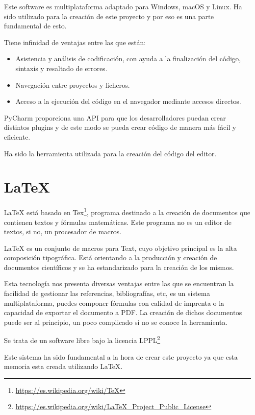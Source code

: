 \documentclass[a4paper, 12pt]{book}
\begin{document}
Este software es multiplataforma adaptado para Windows, macOS y Linux. Ha sido utilizado para la creación de este proyecto y por eso es una parte fundamental de esto.

Tiene infinidad de ventajas entre las que están:

\begin{itemize}
    \item Asistencia y análisis de codificación, con ayuda a la finalización del código, sintaxis y resaltado de errores.
    \item Navegación entre proyectos y ficheros.
    \item Acceso a la ejecución del código en el navegador mediante accesos directos.
\end{itemize}

PyCharm proporciona una API para que los desarrolladores puedan crear distintos plugins y de este modo se pueda crear código de manera más fácil y eficiente.

Ha sido la herramienta utilizada para la creación del código del editor.

\section{LaTeX} %
\label{sec:Latex}
LaTeX está basado en Tex\footnote{\url{https://es.wikipedia.org/wiki/TeX}}, programa destinado a la creación de documentos que contienen textos y fórmulas matemáticas. Este programa no es un editor de textos, si no, un procesador de macros.

LaTeX es un conjunto de macros para Text, cuyo objetivo principal es la alta composición tipográfica. Está orientando a la producción y creación de documentos científicos y se ha estandarizado para la creación de los mismos.

Esta tecnología nos presenta diversas ventajas entre las que se encuentran la facilidad de gestionar las referencias, bibliografías, etc, es un sistema multiplataforma, puedes componer fórmulas con calidad de imprenta o la capacidad de exportar el documento a PDF. La creación de dichos documentos puede ser al principio, un poco complicado si no se conoce la herramienta.

Se trata de un software libre bajo la licencia LPPL\footnote{\url{https://es.wikipedia.org/wiki/LaTeX_Project_Public_License}} 

Este sistema ha sido fundamental a la hora de crear este proyecto ya que esta memoria esta creada utilizando LaTeX.
\end{document}
